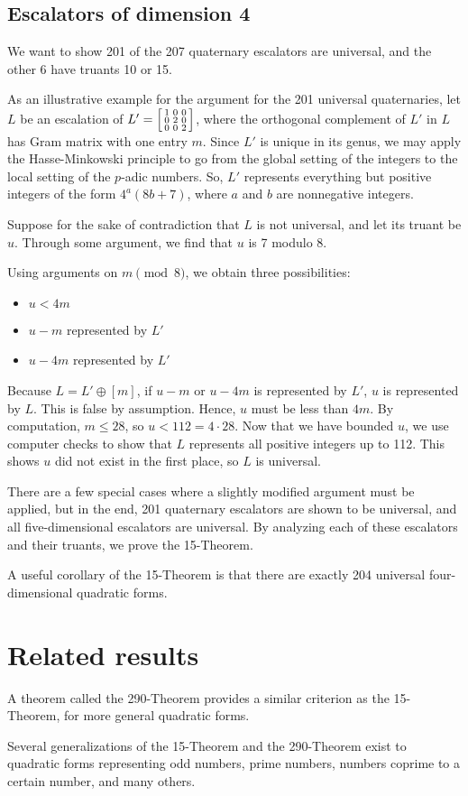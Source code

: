 \documentclass[letterpaper, 12pt]{article}
\begin{document}
\subsection{Escalators of dimension 4}
We want to show 201 of the 207 quaternary escalators are universal, and the other 6 have truants 10 or 15.

As an illustrative example for the argument for the 201 universal quaternaries, let $L$ be an escalation of $L' = \begin{bsmallmatrix} 1 & 0 & 0 \\ 0 & 2 & 0 \\ 0 & 0 & 2 \end{bsmallmatrix}$, where the orthogonal complement of $L'$ in $L$ has Gram matrix with one entry $m$. Since $L'$ is unique in its genus, we may apply the Hasse-Minkowski principle to go from the global setting of the integers to the local setting of the $p$-adic numbers. So, $L'$ represents everything but positive integers of the form $4^a (8b + 7)$, where $a$ and $b$ are nonnegative integers.

Suppose for the sake of contradiction that $L$ is not universal, and let its truant be $u$. Through some argument, we find that $u$ is 7 modulo 8.

Using arguments on $m \pmod 8$, we obtain three possibilities:
\begin{itemize}
    \item $u < 4m$
    \item $u - m$ represented by $L'$
    \item $u - 4m$ represented by $L'$
\end{itemize}
Because $L = L' \oplus [m]$, if $u - m$ or $u - 4m$ is represented by $L'$, $u$ is represented by $L$. This is false by assumption. Hence, $u$ must be less than $4m$. By computation, $m \le 28$, so $u < 112 = 4 \cdot 28$. Now that we have bounded $u$, we use computer checks to show that $L$ represents all positive integers up to 112. This shows $u$ did not exist in the first place, so $L$ is universal.

There are a few special cases where a slightly modified argument must be applied, but in the end, 201 quaternary escalators are shown to be universal, and all five-dimensional escalators are universal. By analyzing each of these escalators and their truants, we prove the 15-Theorem.

A useful corollary of the 15-Theorem is that there are exactly 204 universal four-dimensional quadratic forms.

\section{Related results}
A theorem called the 290-Theorem provides a similar criterion as the 15-Theorem, for more general quadratic forms.

Several generalizations of the 15-Theorem and the 290-Theorem exist to quadratic forms representing odd numbers, prime numbers, numbers coprime to a certain number, and many others.
\end{document}
